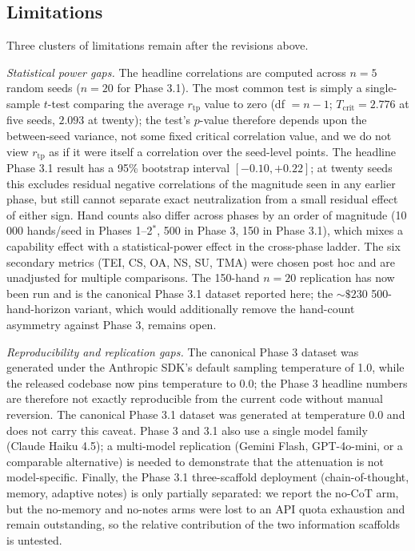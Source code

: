\documentclass[journal]{IEEEtran}
\newcommand{\rtp}{\ensuremath{r_{\mathrm{tp}}}}
\begin{document}
\subsection{Limitations}
Three clusters of limitations remain after the revisions above.

\textit{Statistical power gaps.} The headline correlations are computed across $n = 5$ random seeds ($n = 20$ for Phase 3.1). The most common test is simply a single-sample $t$-test comparing the average $\rtp$ value to zero (df $= n-1$; $T_{\text{crit}} = 2.776$ at five seeds, $2.093$ at twenty); the test's
$p$-value therefore depends upon the between-seed variance, not some
fixed critical correlation value, and we do not view $\rtp$ as if it were itself a correlation over the seed-level points. The headline Phase 3.1 result has a 95\% bootstrap interval $[-0.10, +0.22]$; at twenty seeds this excludes residual negative correlations of the magnitude seen in any earlier phase, but still cannot separate exact neutralization from a small residual effect of either sign. Hand counts also differ across phases by an
order of magnitude (10\,000 hands/seed in Phases 1--2$^{*}$, 500
in Phase 3, 150 in Phase 3.1), which mixes a capability effect
with a statistical-power effect in the cross-phase ladder. The
six secondary metrics (TEI, CS, OA, NS, SU, TMA) were chosen
post hoc and are unadjusted for multiple comparisons. The 150-hand $n = 20$ replication has now been run and is the canonical Phase 3.1 dataset reported here; the ${\sim}\$230$ 500-hand-horizon variant, which would additionally remove the hand-count asymmetry against Phase 3, remains open.

\textit{Reproducibility and replication gaps.} The canonical Phase 3 dataset was generated under the Anthropic SDK's default sampling temperature of 1.0, while the released codebase now pins temperature to 0.0; the Phase 3 headline numbers are therefore not exactly reproducible from the current code without manual reversion. The canonical Phase 3.1 dataset was generated at temperature 0.0 and does not carry this caveat. Phase 3 and 3.1 also use a single model family
(Claude Haiku 4.5); a multi-model replication (Gemini Flash,
GPT-4o-mini, or a comparable alternative) is needed to
demonstrate that the attenuation is not model-specific. Finally,
the Phase 3.1 three-scaffold deployment (chain-of-thought, memory, adaptive notes) is only partially separated: we report the no-CoT arm, but the no-memory and no-notes arms were lost to an API quota exhaustion and remain outstanding, so the relative contribution of the two information scaffolds is untested.
\end{document}
